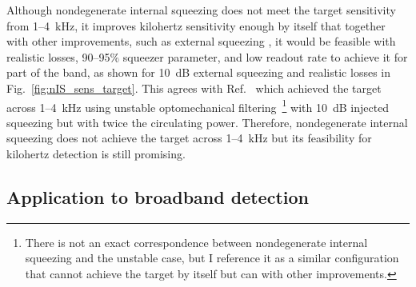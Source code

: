 Although nondegenerate internal squeezing does not meet the target sensitivity from 1--4~kHz, it improves kilohertz sensitivity enough by itself that together with other improvements, such as external squeezing , it would be feasible with realistic losses, 90--95$\%$ squeezer parameter, and low readout rate  to achieve it for part of the band, as shown for 10~dB external squeezing  and realistic losses in Fig.~\ref{fig:nIS_sens_target}. This agrees with Ref.~\cite{miaoDesignGravitationalWaveDetectors2018} which achieved the target across 1--4~kHz using unstable optomechanical filtering~\footnote{There is not an exact correspondence between nondegenerate internal squeezing and the unstable case, but I reference it as a similar configuration that cannot achieve the target by itself but can with other improvements.} with 10~dB injected squeezing but with twice the circulating power. %
Therefore, nondegenerate internal squeezing does not achieve the target across 1--4~kHz but its feasibility for kilohertz detection is still promising.


\subsection{Application to broadband detection}


